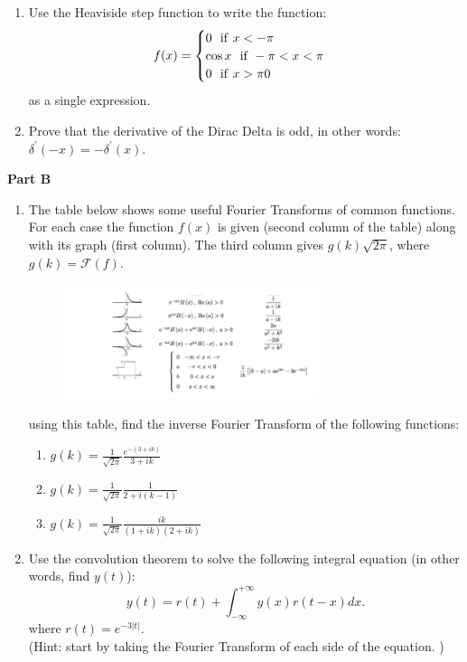 \documentclass[fleqn]{article}
\begin{document}
\begin{enumerate}
    \item Use the Heaviside step function to write the function: 
      $$
      f(x)= 
        \begin{cases}
          0 ~~{\rm  if}~x<-\pi \\
          \cos x ~~{\rm  if}~-\pi<x<\pi \\
          0 ~~{\rm  if}~x>\pi0 \\
        \end{cases}
      $$
    as a single expression.  


    \item Prove that the derivative of the Dirac Delta is odd, in other words: $\delta^\prime(-x)=-\delta^\prime(x)$. 
  \end{enumerate}

  \textbf{Part B}
  \begin{enumerate}
    \item The table below shows some useful Fourier Transforms of common functions. For each case the function $f(x)$ is given (second column of the table) along with its graph (first column). The third column gives  $g(k) \sqrt{2 \pi}$, where $g(k)={ \mathcal F(f)}$. 
    \begin{figure}[h]
      \begin{center}
        \includegraphics[width=0.7\textwidth]{usefulTable.PNG}
      \end{center}
    \end{figure}

    using this table, find the inverse Fourier Transform  of the following functions:
    \begin{enumerate}
      \item $g(k) = \frac{1}{\sqrt{2\pi}} \frac{e^{-(3 + ik)}}{3 + ik}$

      \item $g(k)=\frac{1}{\sqrt{2\pi}}\frac{1}{2 + i(k-1)}$

      \item $g(k)=\frac{1}{\sqrt{2\pi}}\frac{ik}{(1+ik)(2 + ik)}$

    \end{enumerate}



    \item  Use the convolution theorem to solve the following integral equation (in other words, find $y(t)$): 
      $$
      y(t)=r(t) + \int_{-\infty}^{+\infty} y(x) r(t - x) dx. 
      $$
    where $r(t)=e^{-3|t|}$. \\
    (Hint: start by taking the Fourier Transform of each side of the equation. )
  \end{enumerate}
\end{document}
